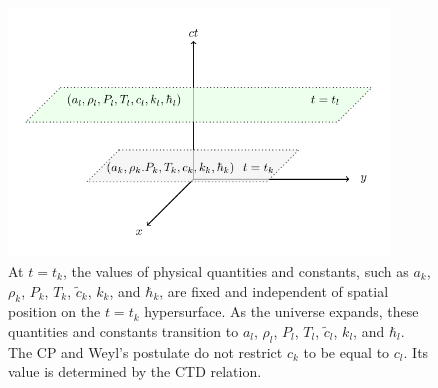 \documentclass[jkps,preprint,fleqn]{revtex4} %
\newcommand{\tc}{\tilde{c}}
\begin{document}
\begin{figure}%
	\begin{center}
	\includegraphics[width=0.9\textwidth]{Fig1.pdf} 
	\caption{At $t = t_k$, the values of physical quantities and constants, such as $a_k$, $\rho_k$, $P_k$,  $T_k$, $\tc_k$,  $k_{k}$, and $\hbar_k$, are fixed and independent of spatial position on the $t=t_k$ hypersurface. As the universe expands, these quantities and constants transition to $a_l$, $\rho_l$, $P_l$,  $T_l$, $\tc_l$,  $k_l$, and $\hbar_l$. The CP and Weyl’s postulate do not restrict $c_k$ to be equal to $c_l$.  Its value is determined by the CTD relation. }
	\label{Fig1}
	\end{center}
\end{figure}
\end{document}
